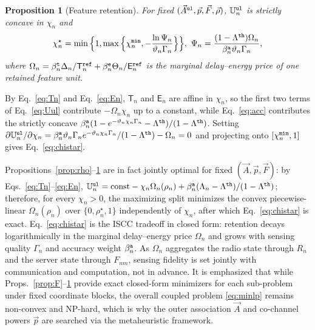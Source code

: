 \documentclass[journal]{IEEEtran}
\newtheorem{proposition}{Proposition}
\begin{document}
\begin{proposition}[Feature retention]\label{prop:chi}
For fixed $(\vec{A}^{\tt ul},\vec{p},\vec{F},\vec{\rho})$, $\mathbb{U}_n^{\tt ul}$ is strictly concave in $\chi_n$ and
\begin{equation}
\chi_n^\star
=\min\Big\{1,\max\Big\{\chi_n^{\tt min},-\frac{\ln\Psi_n}{\vartheta_n \Gamma_n}\Big\}\Big\},
\ 
\Psi_n=\frac{(1-\Lambda^{\tt th})\Omega_n}{\beta_n^{\tt a}\vartheta_n \Gamma_n},
\label{eq:chistar}
\end{equation}
where $\Omega_n=\beta_n^{\tt t}\Delta_n/\mathsf{T}_n^{\tt ref}+\beta_n^{\tt e}\Theta_n/\mathsf{E}_n^{\tt ref}$ is the marginal delay--energy price of one retained feature unit.
\end{proposition}
\begin{IEEEproof}
By Eq.~\eqref{eq:Tn} and Eq.~\eqref{eq:En}, $\mathsf{T}_n$ and $\mathsf{E}_n$ are affine in $\chi_n$, so the first two terms of Eq.~\eqref{eq:Uul} contribute $-\Omega_n\chi_n$ up to a constant, while Eq.~\eqref{eq:acc} contributes the strictly concave $\beta_n^{\tt a}(1-e^{-\vartheta_n\chi_n \Gamma_n}-\Lambda^{\tt th})/(1-\Lambda^{\tt th})$. Setting $\partial\mathbb{U}_n^{\tt ul}/\partial\chi_n=\beta_n^{\tt a}\vartheta_n \Gamma_n e^{-\vartheta_n\chi_n \Gamma_n}/(1-\Lambda^{\tt th})-\Omega_n=0$ and projecting onto $[\chi_n^{\tt min},1]$ gives Eq.~\eqref{eq:chistar}.
\end{IEEEproof}
Propositions~\ref{prop:rho}--\ref{prop:chi} are in fact jointly optimal for fixed $(\vec{A},\vec{p},\vec{F})$: by Eqs.~\eqref{eq:Tn}--\eqref{eq:En}, $\mathbb{U}_n^{\tt ul}=\mathrm{const}-\chi_n\Omega_n(\rho_n)+\beta_n^{\tt a}(\Lambda_n-\Lambda^{\tt th})/(1-\Lambda^{\tt th})$; therefore, for every $\chi_n>0$, the maximizing split minimizes the convex piecewise-linear $\Omega_n(\rho_n)$ over $\{0,\rho_n^\star,1\}$ independently of $\chi_n$, after which Eq.~\eqref{eq:chistar} is exact. Eq.~\eqref{eq:chistar} is the ISCC tradeoff in closed form: retention decays logarithmically in the marginal delay--energy price $\Omega_n$ and grows with sensing quality $\Gamma_n$ and accuracy weight $\beta_n^{\tt a}$. As $\Omega_n$ aggregates the radio state through $R_n$ and the server state through $F_{nm}$, sensing fidelity is set jointly with communication and computation, not in advance.
{\color{blue}It is emphasized that while Props.~\ref{prop:F}--\ref{prop:chi} provide exact closed-form minimizers for each sub-problem under fixed coordinate blocks, the overall coupled problem \eqref{eq:minlp} remains non-convex and NP-hard, which is why the outer association $\vec{A}$ and co-channel powers $\vec{p}$ are searched via the metaheuristic framework.}
\end{document}
